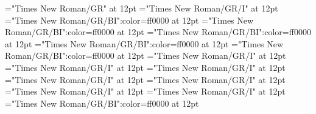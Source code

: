 \documentclass[a4paper]{article}
\begin{document}
\pagestyle{plain}
\sloppy
\setlength{\parfillskip}{0pt plus 1fil}
\font\sectionletter="Times New Roman/GR" at 12pt
\font\articlesectionletter="Times New Roman/GR/I" at 12pt
\font\sensearticlesectionletter="Times New Roman/GR/BI":color=ff0000 at 12pt
\font\grammarcategoryfirstoftypesensearticlesectionletter="Times New Roman/GR/BI":color=ff0000 at 12pt
\font{}="Times New Roman/GR/BI":color=ff0000 at 12pt
\font\wordusefirstoftypedefinitionfirstoftypesensearticlesectionletter="Times New Roman/GR/BI":color=ff0000 at 12pt
\font\examplefirstoftypesensearticlesectionletter="Times New Roman/GR/BI":color=ff0000 at 12pt
\font\subentryfirstoftypearticlesectionletter="Times New Roman/GR/I" at 12pt
\font\headwordfirstoftypesubentryfirstoftypearticlesectionletter="Times New Roman/GR/I" at 12pt
\font\examplefirstoftypesubentryfirstoftypearticlesectionletter="Times New Roman/GR/I" at 12pt
\font\headwordfirstoftypearticlesectionletter="Times New Roman/GR/I" at 12pt
\font\pronunciationfirstoftypearticlesectionletter="Times New Roman/GR/I" at 12pt
\font\stressfirstoftypepronunciationfirstoftypearticlesectionletter="Times New Roman/GR/I" at 12pt
\font\variantinflectionarticlesectionletter="Times New Roman/GR/I" at 12pt
\font\exampleusefirstoftypesensearticlesectionletter="Times New Roman/GR/BI":color=ff0000 at 12pt

\mbox{} 
\newpage 
\newpage 
\setcounter{page}{1} 
\pagestyle{fancy} 
\end{document}
